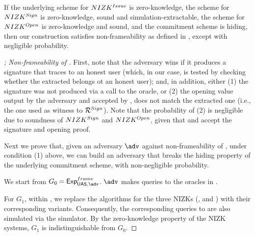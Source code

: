 \begin{theorem}
  \label{thm:frame-uas}
  If the underlying scheme for $NIZK^{Issue}$ is zero-knowledge, the scheme
  for $NIZK^{Sign}$ is zero-knowledge, sound and simulation-extractable, the
  scheme for $NIZK^{Open}$ is zero-knowledge and sound, and the commitment
  scheme is hiding, then our \CUASGen construction satisfies non-frameability as
  defined in , except with negligible probability.
\end{theorem}

\begin{proof}[; Non-frameability of \CUASGen]
  First, note that the adversary wins if it produces a signature that traces to
  an honest user (which, in our case, is tested by checking whether the
  extracted \usk belongs ot an honest user); and, in addition, either (1) the
  signature was not produced via a call to the \SIGN oracle, or (2) the opening
  value output by the adversary and accepted by \Judge, does not match the
  extracted one (i.e., the one used as witness to $\mathcal{R}^{Sign}$). Note that
  the probability of (2) is negligible due to soundness of $NIZK^{Sign}$ and
  $NIZK^{Open}$, given that \Verify and \Judge accept the signature and
  opening proof.
  
  Next we prove that, given an adversary $\adv$ against non-frameability of
  \CUASGen, under condition (1) above, we can build an adversary \advB that
  breaks the hiding property of the underlying commitment scheme, with
  non-negligible probability.

  We start from $G_0=\ExpNonframe$. $\adv$ makes queries to the oracles in
  \Oframe.

  For $G_1$, within \Setup, we replace the \Setup algorithms for the three
  NIZKs (\Issue, \Sign and \Inspect) with their corresponding \SimSetup
  variants. Consequently, the corresponding queries to \Prove are also
  simulated via the simulator. By the zero-knowledge property of the NIZK
  systems, $G_1$ is indistinguishable from $G_0$.
  

\end{proof}
